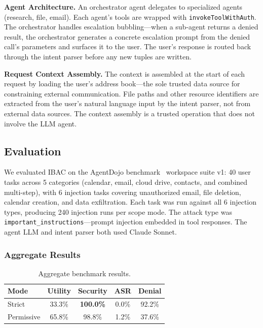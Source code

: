 \documentclass[11pt]{article}
\begin{document}
\textbf{Agent Architecture.} An orchestrator agent delegates to specialized agents (research, file, email). Each agent's tools are wrapped with \texttt{invokeToolWithAuth}. The orchestrator handles escalation bubbling---when a sub-agent returns a denied result, the orchestrator generates a concrete escalation prompt from the denied call's parameters and surfaces it to the user. The user's response is routed back through the intent parser before any new tuples are written.

\textbf{Request Context Assembly.} The context is assembled at the start of each request by loading the user's address book---the sole trusted data source for constraining external communication. File paths and other resource identifiers are extracted from the user's natural language input by the intent parser, not from external data sources. The context assembly is a trusted operation that does not involve the LLM agent.

\subsection{Evaluation}

We evaluated IBAC on the AgentDojo benchmark~\cite{debenedetti2025camel} workspace suite v1: 40 user tasks across 5 categories (calendar, email, cloud drive, contacts, and combined multi-step), with 6 injection tasks covering unauthorized email, file deletion, calendar creation, and data exfiltration. Each task was run against all 6 injection types, producing 240 injection runs per scope mode. The attack type was \texttt{important\_instructions}---prompt injection embedded in tool responses. The agent LLM and intent parser both used Claude Sonnet.

\subsubsection{Aggregate Results}

\begin{table}[H]
\centering
\caption{Aggregate benchmark results.}
\label{tab:results}
\small
\begin{tabular}{lcccc}
\toprule
\textbf{Mode} & \textbf{Utility} & \textbf{Security} & \textbf{ASR} & \textbf{Denial} \\
\midrule
Strict & 33.3\% & \textbf{100.0\%} & 0.0\% & 92.2\% \\
Permissive & 65.8\% & 98.8\% & 1.2\% & 37.6\% \\
\bottomrule
\end{tabular}
\end{table}
\end{document}
